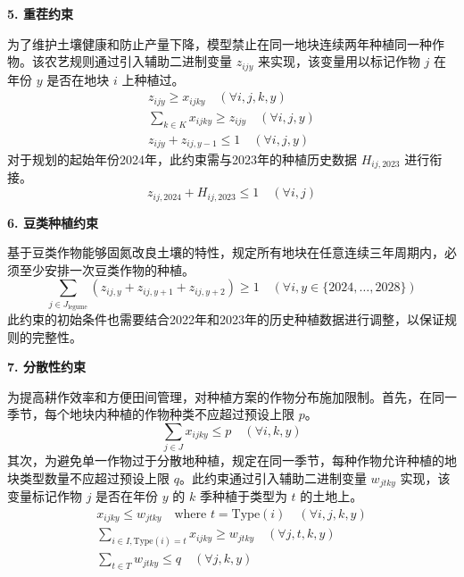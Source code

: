 \textbf{5. 重茬约束}

为了维护土壤健康和防止产量下降，模型禁止在同一地块连续两年种植同一种作物。该农艺规则通过引入辅助二进制变量 $z_{ijy}$ 来实现，该变量用以标记作物 $j$ 在年份 $y$ 是否在地块 $i$ 上种植过。
\begin{gather}
z_{ijy} \ge x_{ijky} \quad (\forall i, j, k, y) \label{eq:z_def1} \\
\sum_{k \in K} x_{ijky} \ge z_{ijy} \quad (\forall i, j, y) \label{eq:z_def2} \\
z_{ijy} + z_{ij,y-1} \le 1 \quad (\forall i, j, y) \label{eq:rotation}
\end{gather}
对于规划的起始年份2024年，此约束需与2023年的种植历史数据 $H_{ij,2023}$ 进行衔接。
\begin{equation}
z_{ij,2024} + H_{ij,2023} \le 1 \quad (\forall i, j) \label{eq:rotation_init}
\end{equation}

\textbf{6. 豆类种植约束}

基于豆类作物能够固氮改良土壤的特性，规定所有地块在任意连续三年周期内，必须至少安排一次豆类作物的种植。
\begin{equation}
\sum_{j \in J_{\text{legume}}} (z_{ij,y} + z_{ij,y+1} + z_{ij,y+2}) \ge 1 \quad (\forall i, y \in \{2024, \dots, 2028\}) \label{eq:legume}
\end{equation}
此约束的初始条件也需要结合2022年和2023年的历史种植数据进行调整，以保证规则的完整性。

\textbf{7. 分散性约束}

为提高耕作效率和方便田间管理，对种植方案的作物分布施加限制。首先，在同一季节，每个地块内种植的作物种类不应超过预设上限 $p$。
\begin{equation}
\sum_{j \in J} x_{ijky} \le p \quad (\forall i, k, y) \label{eq:p_limit}
\end{equation}
其次，为避免单一作物过于分散地种植，规定在同一季节，每种作物允许种植的地块类型数量不应超过预设上限 $q$。此约束通过引入辅助二进制变量 $w_{jtky}$ 实现，该变量标记作物 $j$ 是否在年份 $y$ 的 $k$ 季种植于类型为 $t$ 的土地上。
\begin{gather}
x_{ijky} \le w_{jtky} \quad \text{where } t = \text{Type}(i) \quad (\forall i, j, k, y) \label{eq:w_def1} \\
\sum_{i \in I, \text{Type}(i)=t} x_{ijky} \ge w_{jtky} \quad (\forall j, t, k, y) \label{eq:w_def2} \\
\sum_{t \in T} w_{jtky} \le q \quad (\forall j, k, y) \label{eq:q_limit}
\end{gather}







